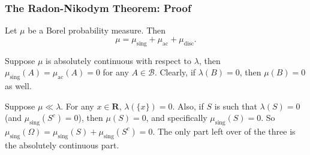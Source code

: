 \documentclass[handout]{beamer}
\begin{document}
\frame
{
\frametitle{The Radon-Nikodym Theorem: Proof} 

Let $\mu$ be a Borel probability measure. Then 
$$
\mu = \mu_{\text{sing}} + \mu_{\text{ac}} + \mu_{\text{disc}}.
$$

Suppose $\mu$ is absolutely continuous with respect to $\lambda$, then $\mu_{\text{sing}}(A) = \mu_{\text{ac}}(A) = 0$ for any $A \in \mathcal{B}$. Clearly, if $\lambda(B) = 0$, then $\mu(B)  = 0$ as well. 
\newline

Suppose $\mu \ll \lambda$. For any $x \in \mathbf{R}$, $\lambda(\{x\}) = 0$. Also, if $S$ is such that $\lambda(S) = 0$ (and $\mu_{\text{sing}}(S^c) = 0$), then $\mu(S) = 0$, and specifically $\mu_{\text{sing}}(S) = 0$. So $\mu_{\text{sing}}(\Omega) = \mu_{\text{sing}}(S) + \mu_{\text{sing}}(S^c) = 0$. The only part left over of the three is the absolutely continuous part.
}
\end{document}
